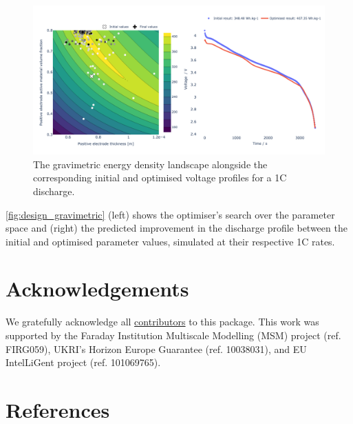 \documentclass[
]{article}
\begin{document}
\begin{figure}
\centering
\includegraphics[width=1\textwidth,height=\textheight]{figures/joss/design.png}
\caption{The gravimetric energy density landscape alongside the
corresponding initial and optimised voltage profiles for a 1C discharge.
\label{fig:design_gravimetric}}
\end{figure}

\autoref{fig:design_gravimetric} (left) shows the optimiser's search
over the parameter space and (right) the predicted improvement in the
discharge profile between the initial and optimised parameter values,
simulated at their respective 1C rates.

\section{Acknowledgements}\label{acknowledgements}

We gratefully acknowledge all
\href{https://github.com/pybop-team/PyBOP?tab=readme-ov-file\#contributors-}{contributors}
to this package. This work was supported by the Faraday Institution
Multiscale Modelling (MSM) project (ref. FIRG059), UKRI's Horizon Europe
Guarantee (ref. 10038031), and EU IntelLiGent project (ref. 101069765).

\section*{References}\label{references}
\end{document}
